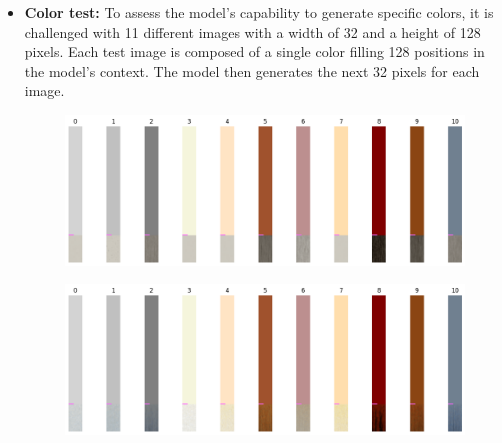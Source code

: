     \begin{itemize}
        \item \textbf{Color test:} To assess the model's capability to generate specific colors, it is challenged with 11 different images with a width of 32 and a height of 128 pixels. Each test image is composed of a single color filling 128 positions in the model's context. The model then generates the next 32 pixels for each image.
    
        \begin{figure}[H]
            \centering
            \begin{minipage}{0.45\textwidth}
                \centering
                \includegraphics[width=\textwidth]{imgs/ColorTest_2.1.7.1_OldData.png} 
                \label{fig:test1_M0_Cit}
            \end{minipage}
            \hfill
            \begin{minipage}{0.45\textwidth}
                \centering
                \includegraphics[width=\textwidth]{imgs/ColorTest_2.1.8.1_128.png} 
                \label{fig:test1_M1_Cit}
            \end{minipage}
    

\end{figure}
\end{itemize}
